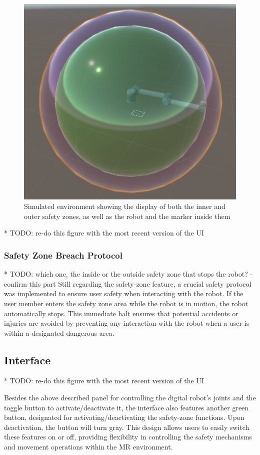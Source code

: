 \begin{figure}[h]
\centering
\includegraphics[width=0.5\linewidth]{figs/dual-safetyzone-robot.png}
\caption{Simulated environment showing the display of both the inner and outer safety zones, as well as the robot and the marker inside them}
\label{fig:dual-safety}
\end{figure}
* TODO: re-do this figure with the most recent version of the UI

\subsubsection{Safety Zone Breach Protocol}
* TODO: which one, the inside or the outside safety zone that stops the robot? - confirm this part
Still regarding the safety-zone feature, a crucial safety protocol was implemented to ensure user safety when interacting with the robot. If the user member enters the safety zone area while the robot is in motion, the robot automatically stops. This immediate halt ensures that potential accidents or injuries are avoided by preventing any interaction with the robot when a user is within a designated dangerous area.
    
\subsection{Interface}

* TODO: re-do this figure with the most recent version of the UI

Besides the above described panel for controlling the digital robot's joints and the toggle button to activate/deactivate it, the interface also features another green button, designated for activating/deactivating the safety-zone functions. Upon deactivation, the button will turn gray. This design allows users to easily switch these features on or off, providing flexibility in controlling the safety mechanisms and movement operations within the \ac{MR} environment.

